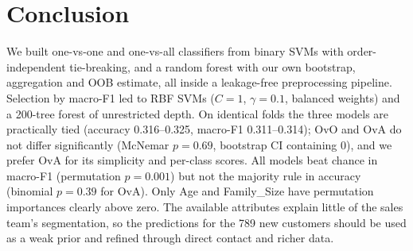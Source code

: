 \documentclass[11pt]{article}
\begin{document}
\section{Conclusion}
We built one-vs-one and one-vs-all classifiers from binary SVMs with order-independent tie-breaking,
and a random forest with our own bootstrap, aggregation and OOB estimate, all inside a leakage-free
preprocessing pipeline. Selection by macro-F1 led to RBF SVMs ($C=1$, $\gamma=0.1$, balanced weights)
and a 200-tree forest of unrestricted depth. On identical folds the three models are practically tied
(accuracy 0.316--0.325, macro-F1 0.311--0.314); OvO and OvA do not differ significantly (McNemar
$p=0.69$, bootstrap CI containing 0), and we prefer OvA for its simplicity and per-class scores.
All models beat chance in macro-F1 (permutation $p=0.001$) but not the majority rule in accuracy
(binomial $p=0.39$ for OvA). Only Age and Family\_Size have permutation importances clearly above zero. The available attributes explain little of
the sales team's segmentation, so the predictions for the 789 new customers should be used as a weak
prior and refined through direct contact and richer data.
\end{document}
